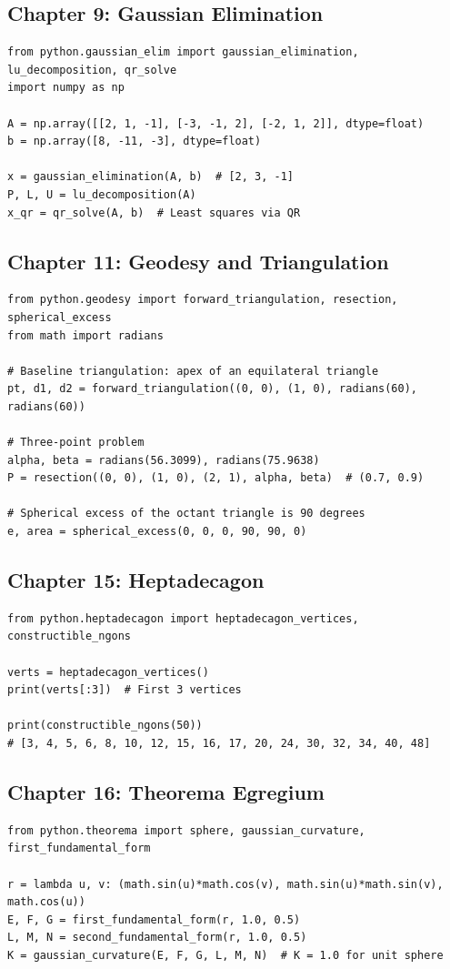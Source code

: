 \subsection{Chapter 9: Gaussian Elimination}
\begin{lstlisting}[style=python]
from python.gaussian_elim import gaussian_elimination, lu_decomposition, qr_solve
import numpy as np

A = np.array([[2, 1, -1], [-3, -1, 2], [-2, 1, 2]], dtype=float)
b = np.array([8, -11, -3], dtype=float)

x = gaussian_elimination(A, b)  # [2, 3, -1]
P, L, U = lu_decomposition(A)
x_qr = qr_solve(A, b)  # Least squares via QR
\end{lstlisting}

\subsection{Chapter 11: Geodesy and Triangulation}
\begin{lstlisting}[style=python]
from python.geodesy import forward_triangulation, resection, spherical_excess
from math import radians

# Baseline triangulation: apex of an equilateral triangle
pt, d1, d2 = forward_triangulation((0, 0), (1, 0), radians(60), radians(60))

# Three-point problem
alpha, beta = radians(56.3099), radians(75.9638)
P = resection((0, 0), (1, 0), (2, 1), alpha, beta)  # (0.7, 0.9)

# Spherical excess of the octant triangle is 90 degrees
e, area = spherical_excess(0, 0, 0, 90, 90, 0)
\end{lstlisting}

\subsection{Chapter 15: Heptadecagon}
\begin{lstlisting}[style=python]
from python.heptadecagon import heptadecagon_vertices, constructible_ngons

verts = heptadecagon_vertices()
print(verts[:3])  # First 3 vertices

print(constructible_ngons(50))
# [3, 4, 5, 6, 8, 10, 12, 15, 16, 17, 20, 24, 30, 32, 34, 40, 48]
\end{lstlisting}

\subsection{Chapter 16: Theorema Egregium}
\begin{lstlisting}[style=python]
from python.theorema import sphere, gaussian_curvature, first_fundamental_form

r = lambda u, v: (math.sin(u)*math.cos(v), math.sin(u)*math.sin(v), math.cos(u))
E, F, G = first_fundamental_form(r, 1.0, 0.5)
L, M, N = second_fundamental_form(r, 1.0, 0.5)
K = gaussian_curvature(E, F, G, L, M, N)  # K = 1.0 for unit sphere
\end{lstlisting}

